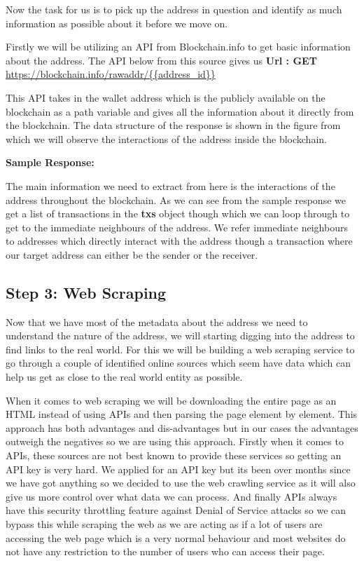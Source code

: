 \documentclass{article}
\begin{document}
        Now the task for us is to pick up the address in question and identify as much information as possible about it before we move on.
        
        Firstly we will be utilizing an API from Blockchain.info\cite{blockchain.com} to get basic information about the address. The API below from this source gives us
        \textbf{Url : GET} \url{https://blockchain.info/rawaddr/{{address_id}}}
        
        This API takes in the wallet address which is the publicly available on the blockchain as a path variable and gives all the information about it directly from the blockchain. The data structure of the response is shown in the figure\cite{} from which we will observe the interactions of the address inside the blockchain.
        
        \textbf{Sample Response: }
        
        
        
        The main information we need to extract from here is the interactions of the address throughout the blockchain. As we can see from the sample response we get a list of transactions in the \textbf{txs} object though which we can loop through to get to the immediate neighbours of the address. We refer immediate neighbours to addresses which directly interact with the address though a transaction where our target address can either be the sender or the receiver. 
        
\pagebreak 

    \subsection{Step 3: Web Scraping}
        Now that we have most of the metadata about the address we need to understand the nature of the address, we will starting digging into the address to find links to the real world. For this we will be building a web scraping service to go through a couple of identified online sources which seem have data which can help us get as close to the real world entity as possible. 
        
        When it comes to web scraping we will be downloading the entire page as an HTML instead of using APIs and then parsing the page element by element. This approach has both advantages and dis-advantages but in our cases the advantages outweigh the negatives so we are using this approach. Firstly when it comes to APIs, these sources are not best known to provide these services so getting an API key is very hard. We applied for an API key but its been over months since we have got anything so we decided to use the web crawling service as it will also give us more control over what data we can process. And finally APIs always have this security throttling feature against Denial of Service attacks so we can bypass this while scraping the web as we are acting as if a lot of users are accessing the web page which is a very normal behaviour and most websites do not have any restriction to the number of users who can access their page.
        
\end{document}
